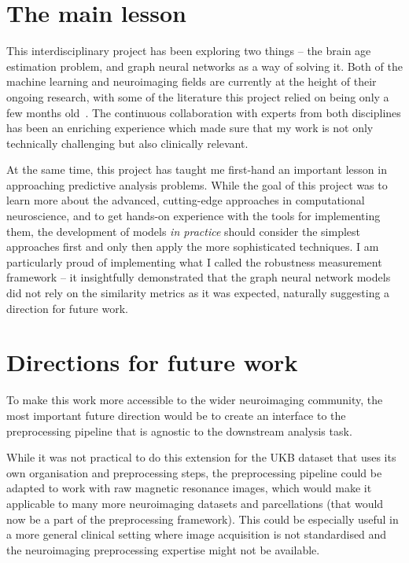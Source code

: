 \section{The main lesson}
This interdisciplinary project has been exploring two things – the brain age estimation problem, and graph neural networks as a way of solving it. Both of the machine learning and neuroimaging fields are currently at the height of their ongoing research, with some of the literature this project relied on being only a few months old~\cite{kaufmann2019, niu2019improved, pervaiz2020optimising}. The continuous collaboration with experts from both disciplines has been an enriching experience which made sure that my work is not only technically challenging but also clinically relevant.


At the same time, this project has taught me first-hand an important lesson in approaching predictive analysis problems. While the goal of this project was to learn more about the advanced, cutting-edge approaches in computational neuroscience, and to get hands-on experience with the tools for implementing them, the development of models \textit{in practice} should consider the simplest approaches first and only then apply the more sophisticated techniques. I am particularly proud of implementing what I called the robustness measurement framework – it insightfully demonstrated that the graph neural network models did not rely on the similarity metrics as it was expected, naturally suggesting a direction for future work.

\section{Directions for future work}
To make this work more accessible to the wider neuroimaging community, the most important future direction would be to create an interface to the preprocessing pipeline that is agnostic to the downstream analysis task.

While it was not practical to do this extension for the UKB dataset that uses its own organisation and preprocessing steps, the preprocessing pipeline could be adapted to work with raw magnetic resonance images, which would make it applicable to many more neuroimaging datasets and parcellations (that would now be a part of the preprocessing framework). This could be especially useful in a more general clinical setting where image acquisition is not standardised and the neuroimaging preprocessing expertise might not be available. 

